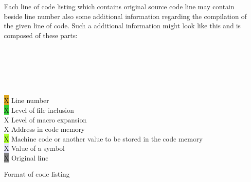     Each line of code listing which contains original source code line may contain beside line number also some additional information regarding the compilation of the given line of code. Such a additional information might look like this and is composed of these parts:

    \begin{code}[h]
        {
            \usecodefont
            \verb'  '{\color{Lavender}{0055}}\verb'                  '{\color{Goldenrod}{18}}\verb'      '{\color{Gray}{X      data     55h}}\\
            {\color{Apricot}{0014}}\verb' '{\color{GreenYellow}{1122}}\verb'       '{\color{LimeGreen}{=1}}\verb'      '{\color{Goldenrod}{33}}\verb'      '{\color{Gray}{l:     inc      s0}}\\
            \verb'                        '{\color{Goldenrod}{35}}\verb' '{\color{ProcessBlue}{+1}}\verb'   '{\color{Gray}{abc     ; Expand macro ``abc'' here}}\\
            {\color{Apricot}{001E}}\verb' '{\color{GreenYellow}{E580}}\verb'               '{\color{Goldenrod}{36}}\verb' '{\color{ProcessBlue}{+1}}\verb'  '{\color{Gray}{                LOAD     s1, s0}}\\
            {\color{Apricot}{0020}}\verb' '{\color{GreenYellow}{F410}}\verb'               '{\color{Goldenrod}{37}}\verb' '{\color{ProcessBlue}{+1}}\verb'  '{\color{Gray}{                SR0     s1}}\\
            {\color{Apricot}{0021}}\verb' '{\color{GreenYellow}{F590}}\verb'               '{\color{Goldenrod}{38}}\verb' '{\color{ProcessBlue}{+1}}\verb'  '{\color{Gray}{                LOAD     s2, s1}}\\

            \colorbox{Goldenrod}{\color{Goldenrod}X} Line number\\
            \colorbox{LimeGreen}{\color{LimeGreen}X} Level of file inclusion\\
            \colorbox{ProcessBlue}{\color{ProcessBlue}X} Level of macro expansion\\
            \colorbox{Apricot}{\color{Apricot}X} Address in code memory\\
            \colorbox{GreenYellow}{\color{GreenYellow}X} Machine code or another value to be stored in the code memory\\
            \colorbox{Lavender}{\color{Lavender}X} Value of a symbol\\
            \colorbox{Gray}{\color{Gray}X} Original line\\
        }
        \caption{Format of code listing}
    \end{code}

